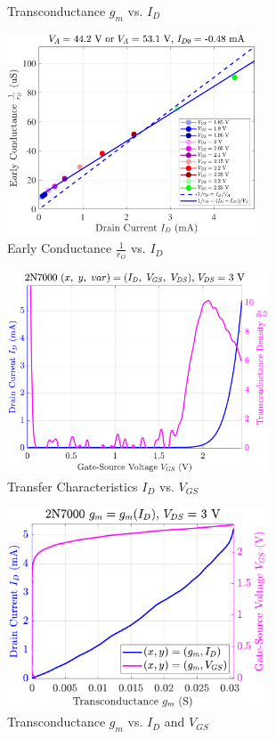 \documentclass[UTF8]{article}
\begin{document}
\begin{center}
\begin{minipage}{0.45\columnwidth}
\begin{figure}[H]
            \caption{Transconductance $g_m$ vs. $I_D$}
        \end{figure}
    \end{minipage}\hfill\begin{minipage}{0.45\columnwidth}
        \begin{figure}[H]\centering
            \includegraphics[height=170pt]{LCE-04-场效应管/assets/2N7000 (NMOS) [onsemi, KH32] current level low (0~5mA)/2025-04-24_00-33-56__stc_rO_Id_Vgs.pdf}
            \caption{Early Conductance $\frac{1}{r_O}$ vs. $I_D$}
        \end{figure}
        \begin{figure}[H]\centering
            \includegraphics[height=170pt]{LCE-04-场效应管/assets/2N7000 (NMOS) [onsemi, KH32] current level low (0~5mA)/2025-04-24_00-34-00__stc_Id_Vgs_Vds.pdf}
            \caption{Transfer Characteristics $I_D$ vs. $V_{GS}$}
        \end{figure}
        \begin{figure}[H]\centering
            \includegraphics[height=170pt]{LCE-04-场效应管/assets/2N7000 (NMOS) [onsemi, KH32] current level low (0~5mA)/2025-04-24_00-34-17__stc_gm_IdVgs_yyplot.pdf}
            \caption{Transconductance $g_m$ vs. $I_D$ and $V_{GS}$}
    \end{figure}
\end{minipage}\end{center}
\end{document}
